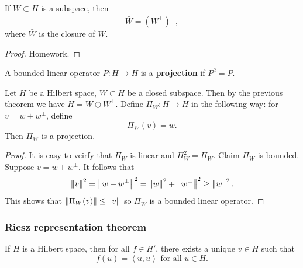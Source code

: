 \documentclass[a4paper]{article}
\renewcommand{\braket}[2]{\left\langle #1, #1 \right\rangle}
\begin{document}
\begin{thm}
If $W \subset H$ is a subspace, then 
\[
\bar{W} = \left( W^\perp \right)^\perp,
\]
where $\bar{W}$ is the closure of $W$.
\end{thm}

\begin{proof}
Homework.
\end{proof}

\begin{defi}[Projection]
A bounded linear operator $P : H \to H$ is a \textbf{projection} 
if $P^2 = P$.
\end{defi}

\begin{thm}
Let $H$ be a Hilbert space, $W \subset H$ be a closed 
subspace. Then by the previous theorem we have $H = W 
\oplus W^\perp$. Define $\Pi_W : H \to H$ in the following 
way: for $v = w + w^\perp$, define 
\[
\Pi_W (v) = w.
\]
Then $\Pi_W$ is a projection.
\end{thm}

\begin{proof}
It is easy to veirfy that $\Pi_W$ is linear
and $\Pi_W^2 = \Pi_W$.
Claim $\Pi_W$ is bounded. Suppose $v = w + w^\perp$. 
It follows that
\[
\left\lVert v\right\rVert^2 = \left\lVert w + w^\perp\right\rVert^2 
= \left\lVert w\right\rVert^2 + \left\lVert w^\perp\right\rVert^2 \geq \left\lVert w\right\rVert^2.
\] 
This shows that $\left\lVert \Pi_W(v)\right\rVert \leq \left\lVert v\right\rVert$ 
so $\Pi_W$ is a bounded linear operator.  
\end{proof}

\subsubsection*{Riesz representation theorem}

\begin{thm}
If $H$ is a Hilbert space, then for all $f \in H'$, 
there exists a unique $v \in H$ such that 
\[
f(u) = \braket{u}{v} \text{ for all $u \in H$}.
\]
\end{thm}
\end{document}
